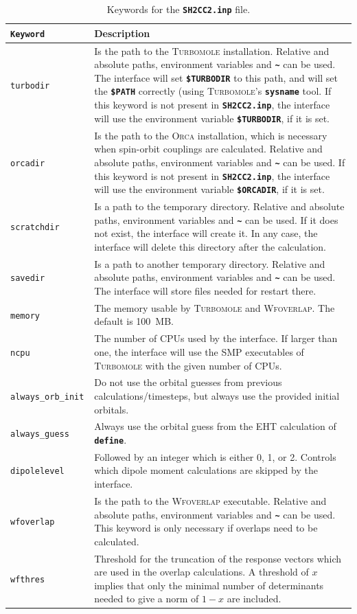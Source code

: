 \documentclass[a4paper,11pt,DIV=15,openany,twoside=false]{scrbook}
\newcommand{\ttt}[1]{\textbf{\texttt{#1}}}
\begin{document}
\begin{table}
  \centering
  \caption{Keywords for the \ttt{SH2CC2.inp} file.}
  \label{tab:ricc2_sh2}
  \begin{tabular}{>{\tt}lp{12cm}}
  \toprule
  Keyword       &Description\\
  \midrule
turbodir        &Is the path to the \textsc{Turbomole} installation. Relative and absolute paths, environment variables and \ttt{\textasciitilde} can be used. The interface will set \ttt{\$TURBODIR} to this path, and will set the \ttt{\$PATH} correctly (using \textsc{Turbomole}'s \ttt{sysname} tool. If this keyword is not present in \ttt{SH2CC2.inp}, the interface will use the environment variable \ttt{\$TURBODIR}, if it is set.\\
orcadir         &Is the path to the \textsc{Orca} installation, which is necessary when spin-orbit couplings are calculated. Relative and absolute paths, environment variables and \ttt{\textasciitilde} can be used. If this keyword is not present in \ttt{SH2CC2.inp}, the interface will use the environment variable \ttt{\$ORCADIR}, if it is set.\\
scratchdir      &Is a path to the temporary directory. Relative and absolute paths, environment variables and \ttt{\textasciitilde} can be used. If it does not exist, the interface will create it. In any case, the interface will delete this directory after the calculation.\\
savedir         &Is a path to another temporary directory.  Relative and absolute paths, environment variables and \ttt{\textasciitilde} can be used. The interface will store files needed for restart there.\\
memory          &The memory usable by \textsc{Turbomole} and \textsc{Wfoverlap}. The default is 100~MB.\\
ncpu            & The number of CPUs used by the interface. If larger than one, the interface will use the SMP executables of \textsc{Turbomole} with the given number of CPUs.\\
always\_orb\_init &Do not use the orbital guesses from previous calculations/timesteps, but always use the provided initial orbitals.\\
always\_guess   &Always use the orbital guess from the EHT calculation of \ttt{define}.\\
dipolelevel     &Followed by an integer which is either 0, 1, or 2. Controls which dipole moment calculations are skipped by the interface.\\
wfoverlap       &Is the path to the \textsc{Wfoverlap} executable. Relative and absolute paths, environment variables and \ttt{\textasciitilde} can be used. This keyword is only necessary if overlaps need to be calculated.\\
wfthres         &Threshold for the truncation of the response vectors which are used in the overlap calculations. A threshold of $x$ implies that only the minimal number of determinants needed to give a norm of $1-x$ are included.\\
  \bottomrule
  \end{tabular}
\end{table}
\end{document}
